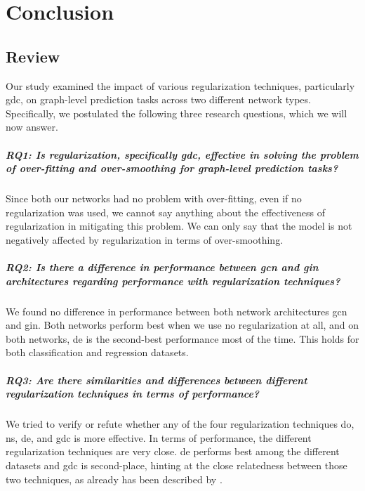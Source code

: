 %
\chapter{Conclusion}
\label{sec:conclusion}




\section{Review}
\label{sec:conclusion:review}

Our study examined the impact of various regularization techniques, particularly \ac{gdc}, on graph-level prediction tasks across two different network types.
Specifically, we postulated the following three research questions, which we will now answer.

\paragraph{RQ1: Is regularization, specifically \acs*{gdc}, effective in solving the problem of over-fitting and over-smoothing for graph-level prediction tasks?}
Since both our networks had no problem with over-fitting, even if no regularization was used, we cannot say anything about the effectiveness of regularization in mitigating this problem.
We can only say that the model is not negatively affected by regularization in terms of over-smoothing.

\paragraph{RQ2: Is there a difference in performance between \acs*{gcn} and \acs*{gin} architectures regarding performance with regularization techniques?}

We found no difference in performance between both network architectures \ac{gcn} and \ac{gin}.
Both networks perform best when we use no regularization at all, and on both networks, \ac{de} is the second-best performance most of the time.
This holds for both classification and regression datasets.


\paragraph{RQ3: Are there similarities and differences between different regularization techniques in terms of performance?}
We tried to verify or refute whether any of the four regularization techniques \ac{do}, \ac{ns}, \ac{de}, and \ac{gdc} is more effective.
In terms of performance, the different regularization techniques are very close.
\Ac{de} performs best among the different datasets and \ac{gdc} is second-place, hinting at the close relatedness between those two techniques, as already has been described by \citep{Hasanzadeh2020}.


